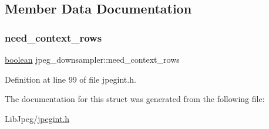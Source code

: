 \subsection{Member Data Documentation}
\mbox{\label{structjpeg__downsampler_ab177a119691924a4bdd2223df7f5ed08}} 
\subsubsection{\texorpdfstring{need\_context\_rows}{need\_context\_rows}}
{\footnotesize\ttfamily \mbox{\hyperlink{jmorecfg_8h_a7c6368b321bd9acd0149b030bb8275ed}{boolean}} jpeg\+\_\+downsampler\+::need\+\_\+context\+\_\+rows}



Definition at line 99 of file jpegint.\+h.



The documentation for this struct was generated from the following file\+:\begin{DoxyCompactItemize}
\item 
Lib\+Jpeg/\mbox{\hyperlink{jpegint_8h}{jpegint.\+h}}\end{DoxyCompactItemize}
